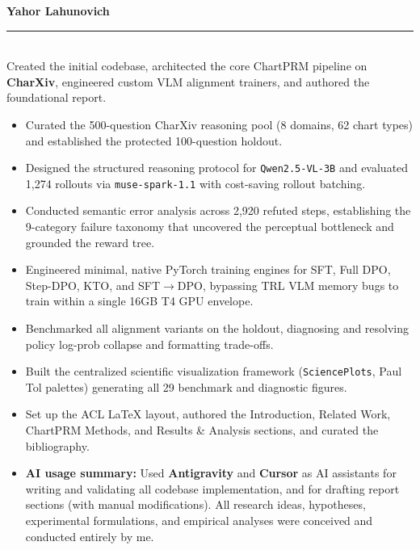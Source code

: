 \documentclass[11pt]{article}
\newcommand{\contribhead}[2]{%
  {\bfseries\color{accent}\large #1\ #2}\\[1pt]
  {\color{accent}\rule{\linewidth}{1.1pt}}\\[4pt]%
}
\begin{document}
\noindent
\begin{minipage}[t]{0.485\textwidth}
\contribhead{Yahor Lahunovich}{}
\small
Created the initial codebase, architected the core ChartPRM pipeline on \textbf{CharXiv}, engineered custom VLM alignment trainers, and authored the foundational report.
\begin{itemize}
  \item Curated the 500-question CharXiv reasoning pool (8 domains, 62 chart types) and established the protected 100-question holdout.
  \item Designed the structured reasoning protocol for \texttt{Qwen2.5-VL-3B} and evaluated 1,274 rollouts via \texttt{muse-spark-1.1} with cost-saving rollout batching.
  \item Conducted semantic error analysis across 2,920 refuted steps, establishing the 9-category failure taxonomy that uncovered the perceptual bottleneck and grounded the reward tree.
  \item Engineered minimal, native PyTorch training engines for SFT, Full DPO, Step-DPO, KTO, and SFT$\rightarrow$DPO, bypassing TRL VLM memory bugs to train within a single 16GB T4 GPU envelope.
  \item Benchmarked all alignment variants on the holdout, diagnosing and resolving policy log-prob collapse and formatting trade-offs.
  \item Built the centralized scientific visualization framework (\texttt{SciencePlots}, Paul Tol palettes) generating all 29 benchmark and diagnostic figures.
  \item Set up the ACL LaTeX layout, authored the Introduction, Related Work, ChartPRM Methods, and Results \& Analysis sections, and curated the bibliography.
  \item \textbf{AI usage summary:} Used \textbf{Antigravity} and \textbf{Cursor} as AI assistants for writing and validating all codebase implementation, and for drafting report sections (with manual modifications). All research ideas, hypotheses, experimental formulations, and empirical analyses were conceived and conducted entirely by me.
\end{itemize}
\end{minipage}%
\hfill
\end{document}
